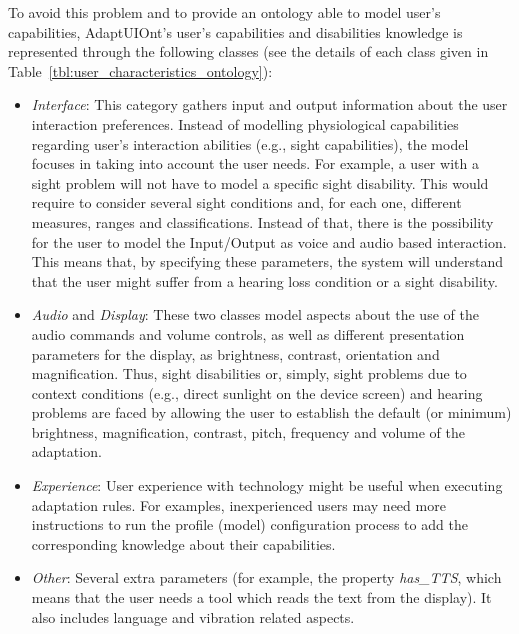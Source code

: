 To avoid this problem and to provide an ontology able to model user's 
capabilities, AdaptUIOnt's user's capabilities and disabilities knowledge is 
represented through the following classes (see the details of each class
given in Table~\ref{tbl:user_characteristics_ontology}):

\begin{itemize}
  \item \textit{Interface}: This category gathers input and output information
  about the user interaction preferences. Instead of modelling physiological
  capabilities regarding user's interaction abilities (e.g., sight capabilities),
  the model focuses in taking into account the user needs. For example, a user
  with a sight problem will not have to model a specific sight disability. This
  would require to consider several sight conditions and, for each one, different
  measures, ranges and classifications. Instead of that, there is the possibility
  for the user to model the Input/Output as voice and audio based interaction. 
  This means that, by specifying these parameters, the system will understand 
  that the user might suffer from a hearing loss condition or a sight disability.

  \item \textit{Audio} and \textit{Display}: These two classes model aspects
  about the use of the audio commands and volume controls, as well as different
  presentation parameters for the display, as brightness, contrast, orientation
  and magnification. Thus, sight disabilities or, simply, sight problems due to 
  context conditions (e.g., direct sunlight on the device screen) and hearing 
  problems are faced by allowing the user to establish the default (or minimum)
  brightness, magnification, contrast, pitch, frequency and volume of the adaptation.
    
  \item \textit{Experience}: User experience with technology might be useful when
  executing adaptation rules. For examples, inexperienced users may need more
  instructions to run the profile (model) configuration process to add the
  corresponding knowledge about their capabilities.
  
  \item \textit{Other}: Several extra parameters (for example, the property
  \textit{has\_TTS}, which means that the user needs a tool which reads the text from
  the display). It also includes language and vibration related aspects.
  

\end{itemize}

